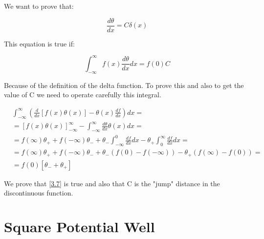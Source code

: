 We want to prove that: 

\begin{equation}
    \label{3.7}
    \frac{d\theta}{dx} = C \delta(x)
\end{equation}

This equation is true if: 

\begin{equation}
    \label{3.8}
    \int_{-\infty}^{\infty}f(x) \frac{d\theta}{dx} dx = f(0) C
\end{equation}

Because of the definition of the delta function. To prove this and also to get the value of C we need to operate carefully this integral.

\begin{equation}
    \label{3.9}
    \begin{split}
        &\int_{-\infty}^{\infty}\left( \frac{d}{dx}[f(x)\theta(x)]-\theta(x)\frac{df}{dx}\right)dx = 
        \\
        & = \left[ f(x) \theta(x) \right]_{-\infty}^{\infty}-\int_{-\infty}^{\infty}\frac{d\theta}{dx}\theta(x)dx =
        \\
        & = f(\infty)\theta_+ + f(-\infty)\theta_- + \theta_- \int_{-\infty}^{0}\frac{df}{dx}dx - \theta_+ \int_{0}^{\infty}\frac{df}{dx}dx = 
        \\
        & = f(\infty)\theta_+ + f(-\infty)\theta_- + \theta_- (f(0)-f(-\infty)) - \theta_+ (f(\infty)-f(0))=
        \\
        & = f(0) [\theta_- + \theta_+]
    \end{split}
\end{equation}

We prove that \ref{3.7} is true and also that C is the "jump" distance in the discontinuous function.



\section{Square Potential Well}

